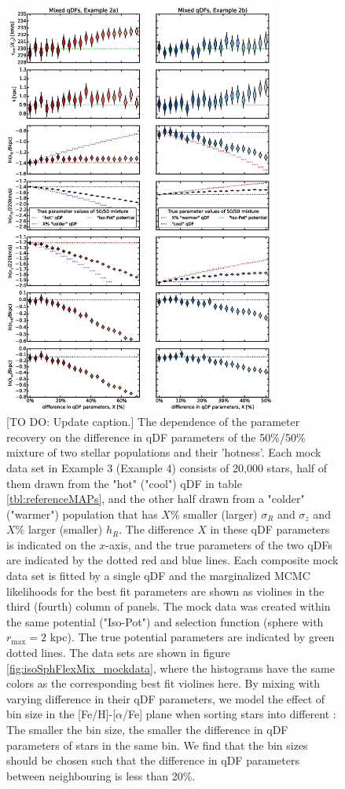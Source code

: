 
\begin{figure}
\includegraphics[width=0.8\textwidth]{figs/isoSphFlexMixDiff_violins.eps}
\caption{[TO DO: Update caption.] The dependence of the parameter recovery on the difference in qDF parameters of the 50\%/50\% mixture of two stellar populations and their 'hotness'. Each mock data set in Example 3 (Example 4) consists of 20,000 stars, half of them drawn from the "hot" ("cool") qDF in table \ref{tbl:referenceMAPs}, and the other half drawn from a "colder" ("warmer") population that has $X\%$ smaller (larger) $\sigma_R$ and $\sigma_z$ and $X\%$ larger (smaller) $h_R$. The difference $X$ in these qDF parameters is indicated on the $x$-axis, and the true parameters of the two qDFs are indicated by the dotted red and blue lines. Each composite mock data set is fitted by a single qDF and the marginalized MCMC likelihoods for the best fit parameters are shown as violines in the third (fourth) column of panels. The mock data was created within the same potential ("Iso-Pot") and selection function (sphere with $r_\text{max} = 2$ kpc). The true potential parameters are indicated by green dotted lines. The data sets are shown in figure \ref{fig:isoSphFlexMix_mockdata}, where the histograms have the same colors as the corresponding best fit violines here. By mixing \MAPs with varying difference in their qDF parameters, we model the effect of bin size in the [Fe/H]-[$\alpha$/Fe] plane when sorting stars into different \MAPs: The smaller the bin size, the smaller the difference in qDF parameters of stars in the same bin. We find that the bin sizes should be chosen such that the difference in qDF parameters between neighbouring \MAPs is less than 20\%.} 
\label{fig:isoSphFlexMixDiff}
\end{figure}

